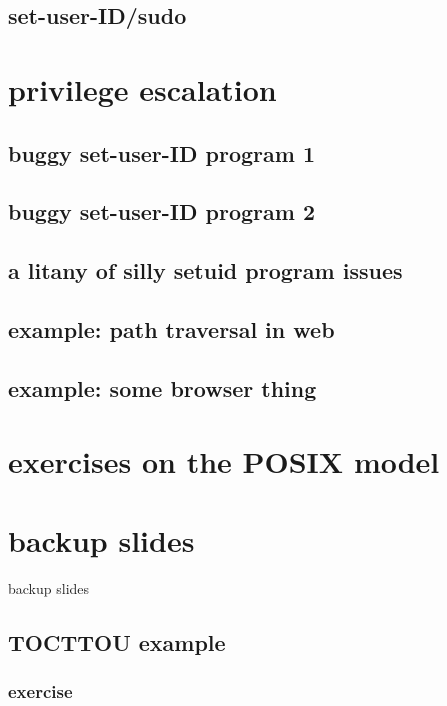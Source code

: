 \subsection{set-user-ID/sudo}


\section{privilege escalation}


\subsection{buggy set-user-ID program 1}


\subsection{buggy set-user-ID program 2}


\subsection{a litany of silly setuid program issues}


\subsection{example: path traversal in web}

\subsection{example: some browser thing}


\section{exercises on the POSIX model}


\section{backup slides}
\begin{frame}{backup slides}
\end{frame}

\subsection{TOCTTOU example}




\subsubsection{exercise}


